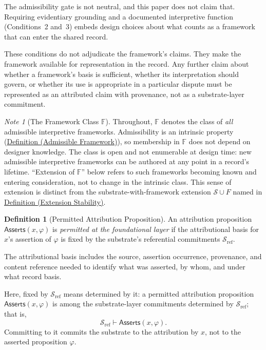 \documentclass[11pt]{article}
\theoremstyle{plain}
\theoremstyle{definition}
\newtheorem{definition}[theorem]{Definition}
\theoremstyle{remark}
\newtheorem{note}[theorem]{Note}
\newcommand{\DefRef}[2]{\hyperref[#1]{Definition (#2)}}
\newcommand{\Substrate}{\mathcal{S}}
\newcommand{\SubstrateRef}{\mathcal{S}_{\mathrm{ref}}}
\newcommand{\Frameworks}{\mathbb{F}}
\newcommand{\Framework}{F}
\newcommand{\entails}{\vdash}
\newcommand{\Asserts}{\mathsf{Asserts}}
\begin{document}
The admissibility gate is not neutral, and this paper does not claim that.
Requiring evidentiary grounding and a documented interpretive function
(Conditions~2 and~3) embeds design choices about what counts as
a framework that can enter the shared record.

These conditions do not adjudicate the framework's claims.
They make the framework available for representation in the record.
Any further claim about whether a framework's basis is sufficient,
whether its interpretation should govern,
or whether its use is appropriate in a particular dispute
must be represented as an attributed claim with provenance,
not as a substrate-layer commitment.

\begin{note}[The Framework Class $\Frameworks$]
  \label{se100.note.FrameworkClass}
  Throughout, $\Frameworks$ denotes the
  class of \emph{all} admissible interpretive frameworks.
  Admissibility is an intrinsic property
  (\DefRef{se100.def.AdmissibleFramework}{Admissible Framework}),
  so membership in $\Frameworks$ does not depend on designer knowledge.
  The class is open and not enumerable at design time:
  new admissible interpretive frameworks can be authored at any
  point in a record's lifetime.
  ``Extension of $\Frameworks$'' below refers to
  such frameworks becoming known and entering consideration,
  not to change in the intrinsic class.
  This sense of extension is distinct from the
  substrate-with-framework extension $\Substrate \cup \Framework$ named in
  \DefRef{se100.def.ExtensionStability}{Extension Stability}.
\end{note}

\begin{definition}[Permitted Attribution Proposition]
  \label{se100.def.PermittedAttributionProposition}
  An attribution proposition $\Asserts(x,\varphi)$ is
  \emph{permitted at the foundational layer} if the attributional basis for
  $x$'s assertion of $\varphi$ is fixed by the substrate's referential
  commitments $\SubstrateRef$.

  The attributional basis includes the source, assertion occurrence,
  provenance, and content reference needed to identify what was asserted,
  by whom, and under what record basis.

  Here, fixed by $\SubstrateRef$ means determined by it:
  a permitted attribution proposition $\Asserts(x,\varphi)$ is among the
  substrate-layer commitments determined by $\SubstrateRef$; that is,
  \[
    \SubstrateRef \entails \Asserts(x,\varphi) .
  \]
  Committing to it commits the substrate to the attribution by $x$,
  not to the asserted proposition $\varphi$.
\end{definition}
\end{document}
